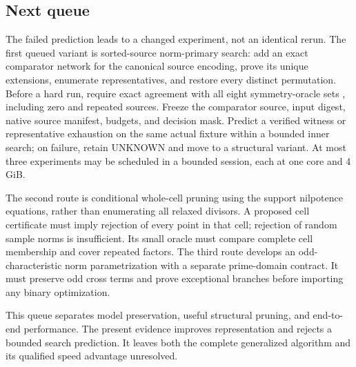 \subsection{Next queue}
The failed prediction leads to a changed experiment, not an identical rerun.
The first queued variant is sorted-source norm-primary search:
add an exact comparator network for the canonical source encoding, prove its
unique extensions, enumerate representatives, and restore every distinct
permutation. Before a hard run, require exact agreement with all eight
symmetry-oracle sets , including zero and repeated sources.
Freeze the comparator source, input digest, native source manifest, budgets,
and decision mask. Predict a verified witness or representative exhaustion
on the same actual fixture within a bounded inner search; on failure,
retain UNKNOWN and move to a structural variant. At most three experiments
may be scheduled in a bounded session, each at one core and 4 GiB.

The second route is conditional whole-cell pruning using the support
nilpotence equations, rather than enumerating all relaxed divisors.
A proposed cell certificate must imply rejection of every point in that
cell; rejection of random sample norms is insufficient. Its small oracle
must compare complete cell membership and cover repeated factors.
The third route develops an odd-characteristic norm parametrization with
a separate prime-domain contract. It must preserve odd cross terms and
prove exceptional branches before importing any binary optimization.

This queue separates model preservation, useful structural pruning, and
end-to-end performance. The present evidence improves representation and
rejects a bounded search prediction. It leaves both the complete generalized
algorithm and its qualified speed advantage unresolved.
